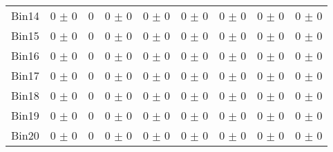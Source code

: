 \begin{tabular}{@{\extracolsep{4pt}}lcccccccc@{}}
     Bin14 & 0 $\pm$ 0 & 0 & 0 $\pm$ 0 & 0 $\pm$ 0 & 0 $\pm$ 0 & 0 $\pm$ 0 & 0 $\pm$ 0 & 0 $\pm$ 0 \\ 
     Bin15 & 0 $\pm$ 0 & 0 & 0 $\pm$ 0 & 0 $\pm$ 0 & 0 $\pm$ 0 & 0 $\pm$ 0 & 0 $\pm$ 0 & 0 $\pm$ 0 \\ 
     Bin16 & 0 $\pm$ 0 & 0 & 0 $\pm$ 0 & 0 $\pm$ 0 & 0 $\pm$ 0 & 0 $\pm$ 0 & 0 $\pm$ 0 & 0 $\pm$ 0 \\ 
     Bin17 & 0 $\pm$ 0 & 0 & 0 $\pm$ 0 & 0 $\pm$ 0 & 0 $\pm$ 0 & 0 $\pm$ 0 & 0 $\pm$ 0 & 0 $\pm$ 0 \\ 
     Bin18 & 0 $\pm$ 0 & 0 & 0 $\pm$ 0 & 0 $\pm$ 0 & 0 $\pm$ 0 & 0 $\pm$ 0 & 0 $\pm$ 0 & 0 $\pm$ 0 \\ 
     Bin19 & 0 $\pm$ 0 & 0 & 0 $\pm$ 0 & 0 $\pm$ 0 & 0 $\pm$ 0 & 0 $\pm$ 0 & 0 $\pm$ 0 & 0 $\pm$ 0 \\ 
     Bin20 & 0 $\pm$ 0 & 0 & 0 $\pm$ 0 & 0 $\pm$ 0 & 0 $\pm$ 0 & 0 $\pm$ 0 & 0 $\pm$ 0 & 0 $\pm$ 0 \\ 
\hline\hline
  \end{tabular}
